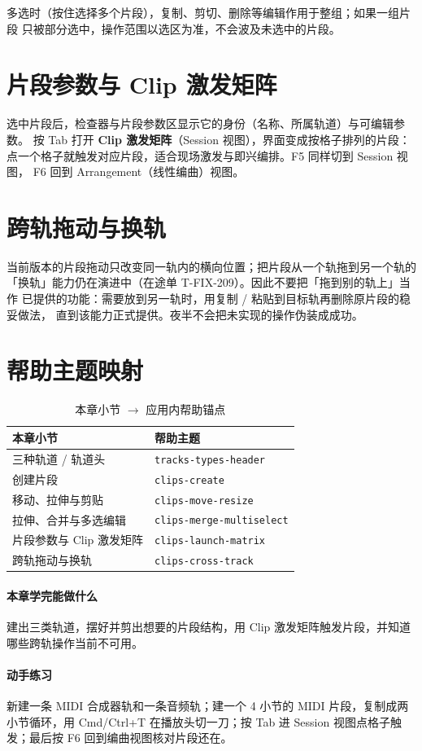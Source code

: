 多选时（按住选择多个片段），复制、剪切、删除等编辑作用于整组；如果一组片段
只被部分选中，操作范围以选区为准，不会波及未选中的片段。


\section{片段参数与 Clip 激发矩阵}

选中片段后，检查器与片段参数区显示它的身份（名称、所属轨道）与可编辑参数。
按 Tab 打开 \textbf{Clip 激发矩阵}（Session 视图），界面变成按格子排列的片段：
点一个格子就触发对应片段，适合现场激发与即兴编排。F5 同样切到 Session 视图，
F6 回到 Arrangement（线性编曲）视图。


\section{跨轨拖动与换轨}

当前版本的片段拖动只改变同一轨内的横向位置；把片段从一个轨拖到另一个轨的
「换轨」能力仍在演进中（在途单 T-FIX-209）。因此不要把「拖到别的轨上」当作
已提供的功能：需要放到另一轨时，用复制 / 粘贴到目标轨再删除原片段的稳妥做法，
直到该能力正式提供。夜半不会把未实现的操作伪装成成功。

\section{帮助主题映射}

\begin{table}[htbp]
\centering
\caption{本章小节 $\to$ 应用内帮助锚点}
\label{tab:ch03-help}
\begin{tabular}{ll}
\hline
本章小节 & 帮助主题 \\
\hline
三种轨道 / 轨道头 & \texttt{tracks-types-header} \\
创建片段 & \texttt{clips-create} \\
移动、拉伸与剪贴 & \texttt{clips-move-resize} \\
拉伸、合并与多选编辑 & \texttt{clips-merge-multiselect} \\
片段参数与 Clip 激发矩阵 & \texttt{clips-launch-matrix} \\
跨轨拖动与换轨 & \texttt{clips-cross-track} \\
\hline
\end{tabular}
\end{table}

\paragraph{本章学完能做什么} 建出三类轨道，摆好并剪出想要的片段结构，用 Clip 激发矩阵触发片段，并知道哪些跨轨操作当前不可用。

\paragraph{动手练习} 新建一条 MIDI 合成器轨和一条音频轨；建一个 4 小节的 MIDI 片段，复制成两小节循环，用 Cmd/Ctrl+T 在播放头切一刀；按 Tab 进 Session 视图点格子触发；最后按 F6 回到编曲视图核对片段还在。
